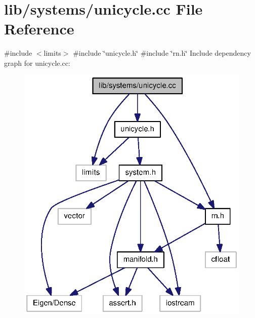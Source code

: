 \section{lib/systems/unicycle.cc \-File \-Reference}
\label{unicycle_8cc}
{\ttfamily \#include $<$limits$>$}\*
{\ttfamily \#include \char`\"{}unicycle.\-h\char`\"{}}\*
{\ttfamily \#include \char`\"{}rn.\-h\char`\"{}}\*
\-Include dependency graph for unicycle.\-cc\-:\nopagebreak
\begin{figure}[H]
\begin{center}
\leavevmode
\includegraphics[width=322pt]{unicycle_8cc__incl}
\end{center}
\end{figure}
